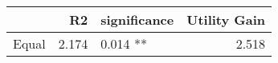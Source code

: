 \begin{tabular}{lrlr}
\toprule
{} &    R2 & significance &  Utility Gain \\
\midrule
Equal & 2.174 &     0.014 ** &         2.518 \\
\bottomrule
\end{tabular}
